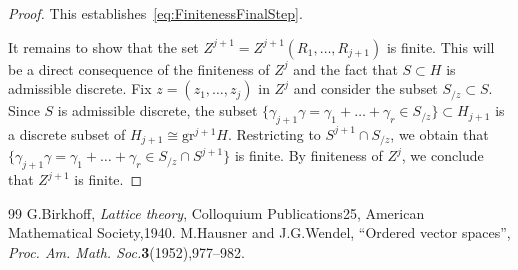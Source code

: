 \documentclass[10pt,a4paper]{amsart}
\newcommand{\grm}[2]{\mathrm{gr}_{#1}^{#2}}
\theoremstyle{definition}\newtheorem{defi}[cdrthm]{Definition}
\begin{document}
\begin{proof}
This establishes~\eqref{eq:FinitenessFinalStep}.



It remains to show that the set $Z^{j+1} =Z^{j+1}(R_1, \dots, R_{j+1})$ is finite. This will be a direct consequence of the finiteness of $Z^j$ and the fact that $S \subset H$ is admissible discrete. Fix $z =(z_1, \dots, z_j)$ in $Z^j$ and consider the subset $S_{/z}\!\!\subset\!S$. Since $S$
is admissible discrete, the subset $\{\gamma_{j+1} \gamma = \gamma_1 + \dots + \gamma_r \in S_{/z}\} \subset H_{j+1}$ is a discrete subset of $H_{j+1} \cong \grm{}{j+1}H$. Restricting to $S^{j+1} \cap S_{/z}$, we obtain that $\{\gamma_{j+1} \gamma = \gamma_1 + \dots + \gamma_r \in S_{/z} \cap S^{j+1}\}$ is finite. By finiteness of $Z^j$, we conclude that $Z^{j+1}$ is finite.
\end{proof}

\begin{thebibliography}{99}
 G.Birkhoff, \emph{Lattice theory}, Colloquium Publications25, American Mathematical Society,1940.
 M.Hausner and J.G.Wendel, ``Ordered vector spaces'', \emph{Proc. Am. Math. Soc.}\textbf{3}(1952),977--982.
\end{thebibliography}
\end{document}

